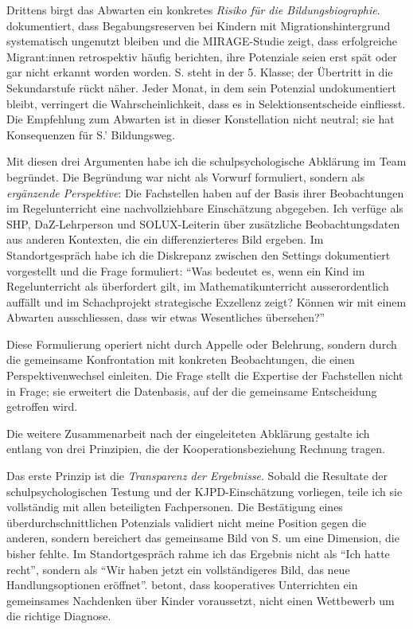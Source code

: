 \documentclass[ngerman, a4paper]{article}
\begin{document}
Drittens birgt das Abwarten ein konkretes \textit{Risiko für die
  Bildungsbiographie}. \textcite{stamm2014mirage} dokumentiert, dass Begabungsreserven bei Kindern
mit Migrationshintergrund systematisch ungenutzt bleiben und die
MIRAGE-Studie zeigt, dass erfolgreiche Migrant:innen retrospektiv häufig
berichten, ihre Potenziale seien erst spät oder gar nicht erkannt worden
worden. S. steht in der 5. Klasse; der Übertritt in
die Sekundarstufe rückt näher. Jeder Monat, in dem sein Potenzial
undokumentiert bleibt, verringert die Wahrscheinlichkeit, dass es in
Selektionsentscheide einfliesst. Die Empfehlung zum Abwarten ist in
dieser Konstellation nicht neutral; sie hat Konsequenzen für S.' Bildungsweg.

Mit diesen drei Argumenten habe ich die schulpsychologische Abklärung im
Team begründet. Die Begründung war nicht als Vorwurf formuliert, sondern
als \textit{ergänzende Perspektive}: Die Fachstellen haben auf der Basis
ihrer Beobachtungen im Regelunterricht eine nachvollziehbare Einschätzung
abgegeben. Ich verfüge als SHP, DaZ-Lehrperson und SOLUX-Leiterin über
zusätzliche Beobachtungsdaten aus anderen Kontexten, die ein differenzierteres
Bild ergeben. Im Standortgespräch habe ich die Diskrepanz zwischen den
Settings dokumentiert vorgestellt und die Frage formuliert:
\enquote{Was bedeutet es, wenn ein Kind im Regelunterricht als überfordert
  gilt, im Mathematikunterricht ausserordentlich auffällt und im Schachprojekt
  strategische Exzellenz zeigt? Können wir mit einem Abwarten ausschliessen,
  dass wir etwas Wesentliches übersehen?}

Diese Formulierung operiert nicht durch Appelle oder Belehrung, sondern durch
die gemeinsame Konfrontation mit konkreten Beobachtungen, die einen
Perspektivenwechsel einleiten. Die Frage stellt die Expertise der
Fachstellen nicht in Frage; sie erweitert die Datenbasis, auf der die
gemeinsame Entscheidung getroffen wird.

Die weitere Zusammenarbeit nach der eingeleiteten Abklärung gestalte ich
entlang von drei Prinzipien, die der Kooperationsbeziehung Rechnung tragen.

Das erste Prinzip ist die \textit{Transparenz der Ergebnisse}. Sobald die
Resultate der schulpsychologischen Testung und der KJPD-Einschätzung vorliegen,
teile ich sie vollständig mit allen beteiligten Fachpersonen. Die Bestätigung
eines überdurchschnittlichen Potenzials validiert nicht meine Position gegen
die anderen, sondern bereichert das gemeinsame Bild von S. um eine Dimension,
die bisher fehlte. Im Standortgespräch rahme ich das Ergebnis nicht als
\enquote{Ich hatte recht}, sondern als \enquote{Wir haben jetzt ein
  vollständigeres Bild, das neue Handlungsoptionen eröffnet}.
\textcite[S.\,151--160]{kummerwyss2017kooperativunterrichten} betont, dass
kooperatives Unterrichten ein gemeinsames Nachdenken über Kinder
voraussetzt, nicht einen Wettbewerb um die richtige Diagnose.
\end{document}
